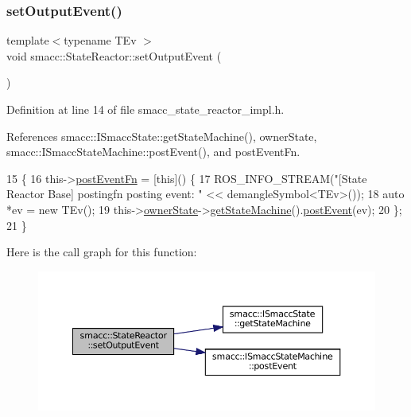 \subsubsection{\texorpdfstring{set\+Output\+Event()}{setOutputEvent()}}
{\footnotesize\ttfamily template$<$typename T\+Ev $>$ \\
void smacc\+::\+State\+Reactor\+::set\+Output\+Event (\begin{DoxyParamCaption}{ }\end{DoxyParamCaption})}



Definition at line 14 of file smacc\+\_\+state\+\_\+reactor\+\_\+impl.\+h.



References smacc\+::\+I\+Smacc\+State\+::get\+State\+Machine(), owner\+State, smacc\+::\+I\+Smacc\+State\+Machine\+::post\+Event(), and post\+Event\+Fn.


\begin{DoxyCode}
15 \{
16     this->\hyperlink{classsmacc_1_1StateReactor_a1d97ae5c1689b6716c60c19c94a7eeae}{postEventFn} = [\textcolor{keyword}{this}]() \{
17         ROS\_INFO\_STREAM(\textcolor{stringliteral}{"[State Reactor Base] postingfn posting event: "} << demangleSymbol<TEv>());
18         \textcolor{keyword}{auto} *ev = \textcolor{keyword}{new} TEv();
19         this->\hyperlink{classsmacc_1_1StateReactor_aabd30af9412a8fea9ec5906f173d9d4a}{ownerState}->\hyperlink{classsmacc_1_1ISmaccState_a562bb3f9a3ac16b8be71e4794c9e7523}{getStateMachine}().\hyperlink{classsmacc_1_1ISmaccStateMachine_ad80cdd7bbc9a9f3b221c625754fed1ed}{postEvent}(ev);
20     \};
21 \}
\end{DoxyCode}
Here is the call graph for this function\+:
\nopagebreak
\begin{figure}[H]
\begin{center}
\leavevmode
\includegraphics[width=350pt]{classsmacc_1_1StateReactor_ae9d0dd0c8cdcc57f8881f0962040c8ed_cgraph}
\end{center}
\end{figure}
\mbox{\label{classsmacc_1_1StateReactor_a445bc3c90980d75d7d815b85cfb68b21}} 
